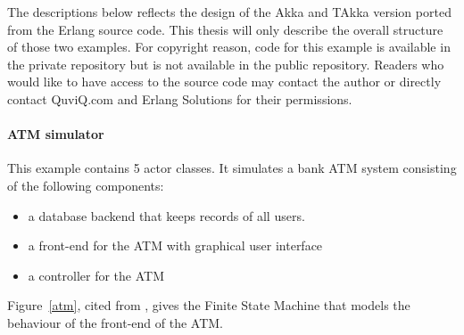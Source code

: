 The descriptions below reflects the design of the Akka and TAkka version ported 
from the Erlang source code.  This thesis will only describe the overall 
structure of those two examples.  For copyright reason, code for this example
is available in the private repository but is not available in the 
public repository.  Readers who would like to have access to the source 
code may contact the author or directly contact QuviQ.com and Erlang Solutions for their permissions.







\paragraph{ATM simulator} This example contains 5 actor classes.  It simulates 
a bank ATM system consisting of the following components:

\begin{itemize}
 \item a database backend that keeps records of all users.
 \item a front-end for the ATM with graphical user interface
 \item a controller for the ATM
\end{itemize}

Figure~\ref{atm}, cited from \citep{atmprivate}, gives the Finite State Machine 
that models the behaviour of the front-end of the ATM.


